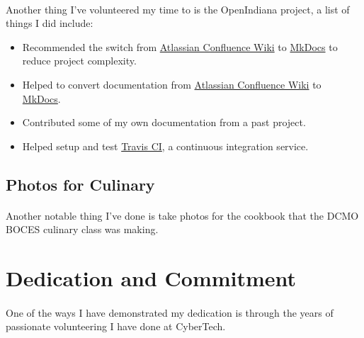 \paragraph{}
Another thing I've volunteered my time to is the OpenIndiana project, a list of
things I did include:
\par


\begin{itemize}
	\item{Recommended the switch from \href{https://www.atlassian.com/software/confluence}{Atlassian Confluence Wiki} to \href{http://www.mkdocs.org/}{MkDocs} to reduce project complexity.}
	\item {Helped to convert documentation from \href{https://www.atlassian.com/software/confluence}{Atlassian Confluence Wiki} to \href{http://www.mkdocs.org/}{MkDocs}.}
	\item {Contributed some of my own documentation from a past project.}
	\item {Helped setup and test \href{https://travis-ci.org/}{Travis CI}, a continuous integration service.}
\end{itemize}

\subsection{Photos for Culinary}
\paragraph{}
Another notable thing I've done is take photos for the cookbook that the DCMO
BOCES culinary class was making.
\par

\section{Dedication and Commitment}
\paragraph{}
One of the ways I have demonstrated my dedication is through the years of
passionate volunteering I have done at CyberTech.
\par
